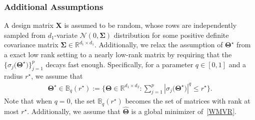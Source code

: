 \documentclass[alpha-refs]{wiley-article}
\begin{document}
\subsubsection{Additional Assumptions}
A design matrix $\boldsymbol{X}$ is assumed to be random, whose rows are independently sampled from $d_{1}$-variate $\mathcal{N}(0,\boldsymbol{\Sigma})$ distribution for some positive definite covariance matrix $\boldsymbol{\Sigma}\in\mathbb{R}^{d_{1} \times d_{1}}$.
Additionally, we relax the assumption of $\boldsymbol{\Theta}^{\star}$ from a exact low rank setting to a nearly low-rank matrix by requiring that the $\{\sigma_{j}\big(\boldsymbol{\Theta}^{\star}\big)\}_{j=1}^{p}$ decays fast enough.
Specifically, for a parameter $q\in[0,1]$ and a radius $r^{\star}$, we assume that
\begin{align*}
    \boldsymbol{\Theta}^{\star} \in \mathbb{B}_{q}(r^{\star})
    := \bigg\{ \boldsymbol{\Theta}\in\mathbb{R}^{d_{1} \times d_{2}} :
    \sum_{j=1}^{p} \left| \sigma_{j}\big(\boldsymbol{\Theta}^{\star} \big) \right|^{q} \leq r^{\star}
    \bigg\}.
\end{align*}
Note that when $q=0$, the set $\mathbb{B}_{q}(r^{\star})$ becomes the set of matrices with rank at most $r^{\star}$.
Additionally, we assume that $\boldsymbol{\widehat{\Theta}}$ is a global minimizer of~\eqref{WMVR}.
\end{document}
